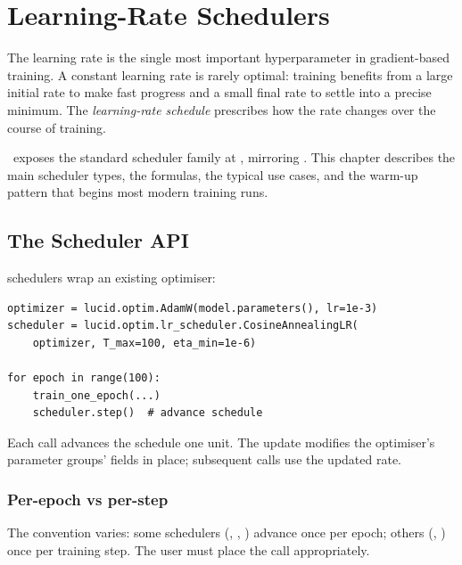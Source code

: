 \chapter{Learning-Rate Schedulers}
\label{ch:lr_schedulers}

The learning rate is the single most important hyperparameter
in gradient-based training. A constant learning rate is rarely
optimal: training benefits from a large initial rate to make fast
progress and a small final rate to settle into a precise minimum.
The \emph{learning-rate schedule} prescribes how the rate
changes over the course of training.

\Lucid\ exposes the standard scheduler family at
, mirroring . This
chapter describes the main scheduler types, the formulas, the
typical use cases, and the warm-up pattern that begins most
modern training runs.

\section{The Scheduler API}
\label{sec:lr_schedulers:api}

 schedulers wrap an existing
optimiser:

\begin{lstlisting}[style=lucid,language=LucidPython]
optimizer = lucid.optim.AdamW(model.parameters(), lr=1e-3)
scheduler = lucid.optim.lr_scheduler.CosineAnnealingLR(
    optimizer, T_max=100, eta_min=1e-6)

for epoch in range(100):
    train_one_epoch(...)
    scheduler.step()  # advance schedule
\end{lstlisting}

Each  call advances the schedule one unit. The
update modifies the optimiser's parameter groups' 
fields in place; subsequent  calls use the
updated rate.

\subsection{Per-epoch vs per-step}
\label{ssec:lr_schedulers:per_epoch_vs_step}

The convention varies: some schedulers (,
, ) advance once per
epoch; others (, )
once per training step. The user must place the 
call appropriately.

